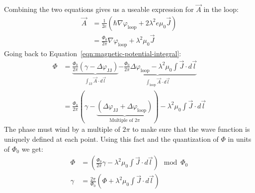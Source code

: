 Combining the two equations gives us a useable expression for $\vec{A}$ in the loop:
\begin{align}
	\vec{A} &= \frac{1}{2e}\left(\hbar \nabla \varphi_{\text{loop}} + 2\lambda^2e\mu_0\vec{J} \right) \nonumber \\
	&= \frac{\Phi_0}{2\pi} \nabla \varphi_{\text{loop}} + \lambda^2\mu_0\vec{J}
\end{align}
Going back to Equation~\ref{eqn:magnetic-potential-integral}:
\begin{align}
	\Phi &= \underbrace{\frac{\Phi_0}{2\pi} \left(\gamma - \Delta\varphi_{\text{JJ}}\right)}_{\int_{\text{JJ}}\vec{A} \cdot d\vec{l}} \underbrace{- \frac{\Phi_0}{2\pi}\Delta \varphi_{\text{loop}} - \lambda^2\mu_0 \int \vec{J}\cdot d \vec{l}}_{\int_{\text{loop}}\vec{A}\cdot d\vec{l}} \nonumber \\
	&= \frac{\Phi_0}{2\pi} \left(\gamma - \underbrace{\left(\Delta\varphi_{\text{JJ}} + \Delta\varphi_{\text{loop}}\right)}_{\text{Multiple of } 2\pi} \right) - \lambda^2\mu_0 \int \vec{J}\cdot d \vec{l}
\end{align}
The phase must wind by a multiple of $2\pi$ to make sure that the wave function is uniquely defined at each point. Using this fact and the quantization of $\Phi$ in units of $\Phi_0$ we get:
\begin{align}
	\Phi &= \left(\frac{\Phi_0}{2\pi}\gamma - \lambda^2\mu_0 \int \vec{J}\cdot d \vec{l} \right) \mod \Phi_0 \\ 
	\gamma &= \frac{2\pi}{\Phi_0}\left(\Phi + \lambda^2\mu_0 \int \vec{J}\cdot d \vec{l} \right)
\end{align}

